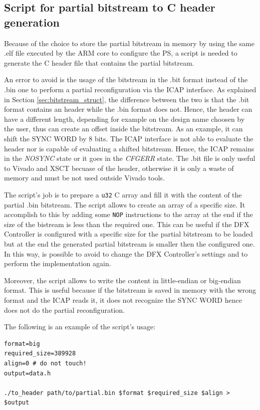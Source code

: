 \subsection{Script for partial bitstream to C header generation}
\label{sec:script_header}

Because of the choice to store the partial bitstream in memory by using the same .elf file executed by the ARM core to configure the PS, a script is needed to generate the C header file that contains the partial bitstream. \bigskip

An error to avoid is the usage of the bitstream in the .bit format instead of the .bin one to perform a partial reconfiguration via the ICAP interface. As explained in Section \ref{sec:bitstream_struct}, the difference between the two is that the .bit format contains an header while the .bin format does not. Hence, the header can have a different length, depending for example on the design name choosen by the user, thus can create an offset inside the bitstream. As an example, it can shift the SYNC WORD by 8 bits. The ICAP interface is not able to evaluate the header nor is capable of evaluating a shifted bitstream. Hence, the ICAP remains in the \textit{NOSYNC} state or it goes in the \textit{CFGERR} state. The .bit file is only useful to Vivado and XSCT becuase of the header, otherwise it is only a waste of memory and must be not used outside Vivado tools.\bigskip

The script's job is to prepare a \texttt{u32} C array and fill it with the content of the partial .bin bitstream. The script allows to create an array of a specific size. It accomplish to this by adding some \texttt{NOP} instructions to the array at the end if the size of the bistream is less than the required one. This can be useful if the DFX Controller is configured with a specific size for the partial bitstream to be loaded but at the end the generated partial bitstream is smaller then the configured one. In this way, is possible to avoid to change the DFX Controller's settings and to perform the implementation again. \bigskip

Moreover, the script allows to write the content in little-endian or big-endian format. This is useful because if the bitstream is saved in memory with the wrong format and the ICAP reads it, it does not recognize the SYNC WORD hence does not do the partial reconfiguration.\bigskip

The following is an example of the script's usage:
\begin{lstlisting}[style=preformatted]
format=big
required_size=389928
align=0 # do not touch!
output=data.h

./to_header path/to/partial.bin $format $required_size $align > $output
\end{lstlisting}

